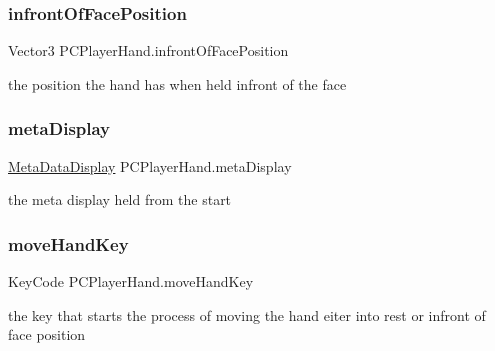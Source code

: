 \subsubsection{\texorpdfstring{infront\+Of\+Face\+Position}{infrontOfFacePosition}}
{\footnotesize\ttfamily Vector3 P\+C\+Player\+Hand.\+infront\+Of\+Face\+Position\hspace{0.3cm}{\ttfamily [private]}}



the position the hand has when held infront of the face 

\mbox{\label{class_p_c_player_hand_a132e4dc18579e0b2b561857fafaca912}} 
\subsubsection{\texorpdfstring{meta\+Display}{metaDisplay}}
{\footnotesize\ttfamily \mbox{\hyperlink{class_meta_data_display}{Meta\+Data\+Display}} P\+C\+Player\+Hand.\+meta\+Display\hspace{0.3cm}{\ttfamily [private]}}



the meta display held from the start 

\mbox{\label{class_p_c_player_hand_a3f0649f12dc9268301b87757fab97873}} 
\subsubsection{\texorpdfstring{move\+Hand\+Key}{moveHandKey}}
{\footnotesize\ttfamily Key\+Code P\+C\+Player\+Hand.\+move\+Hand\+Key\hspace{0.3cm}{\ttfamily [private]}}



the key that starts the process of moving the hand eiter into rest or infront of face position 

\mbox{\label{class_p_c_player_hand_aaa5dc972ddaedd270c6f4c19a4c4f61b}} 
